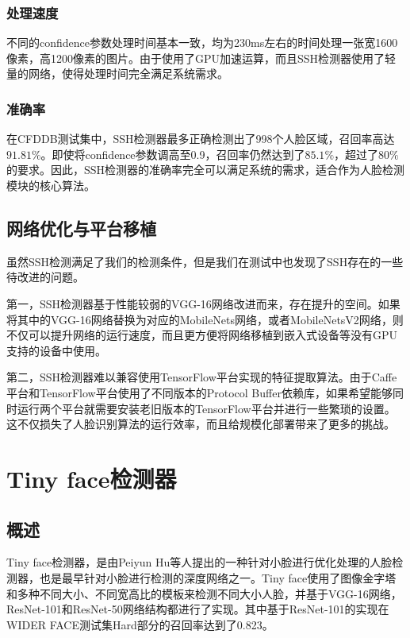 \subsubsection{处理速度}

不同的confidence参数处理时间基本一致，均为230ms左右的时间处理一张宽1600像素，高1200像素的图片。由于使用了GPU加速运算，而且SSH检测器使用了轻量的网络，使得处理时间完全满足系统需求。

\subsubsection{准确率}

在CFDDB测试集中，SSH检测器最多正确检测出了998个人脸区域，召回率高达$91.81\%$。即使将confidence参数调高至0.9，召回率仍然达到了$85.1\%$，超过了$80\%$的要求。因此，SSH检测器的准确率完全可以满足系统的需求，适合作为人脸检测模块的核心算法。

\subsection{网络优化与平台移植}

虽然SSH检测满足了我们的检测条件，但是我们在测试中也发现了SSH存在的一些待改进的问题。

第一，SSH检测器基于性能较弱的VGG-16网络\cite{simonyan2014very}改进而来，存在提升的空间。如果将其中的VGG-16网络替换为对应的MobileNets网络\cite{howard2017mobilenets}，或者MobileNetsV2网络\cite{sandler2018inverted}，则不仅可以提升网络的运行速度，而且更方便将网络移植到嵌入式设备等没有GPU支持的设备中使用。

第二，SSH检测器难以兼容使用TensorFlow平台实现的特征提取算法。由于Caffe平台和TensorFlow平台使用了不同版本的Protocol Buffer依赖库，如果希望能够同时运行两个平台就需要安装老旧版本的TensorFlow平台并进行一些繁琐的设置。这不仅损失了人脸识别算法的运行效率，而且给规模化部署带来了更多的挑战。

\section{Tiny face检测器}

\subsection{概述}

Tiny face检测器\cite{hu2017finding}，是由Peiyun Hu等人提出的一种针对小脸进行优化处理的人脸检测器，也是最早针对小脸进行检测的深度网络之一。Tiny face使用了图像金字塔和多种不同大小、不同宽高比的模板来检测不同大小人脸，并基于VGG-16网络\cite{simonyan2014very}，ResNet-101和ResNet-50网络\cite{he2016deep}结构都进行了实现。其中基于ResNet-101的实现在WIDER FACE测试集Hard部分的召回率达到了0.823\cite{hu2017finding}。

